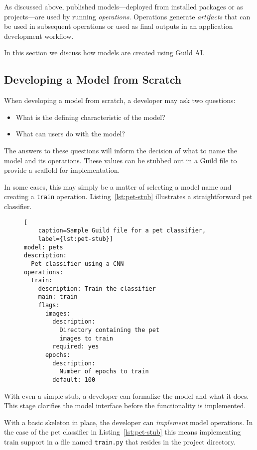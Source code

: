 \documentclass{article}
\begin{document}
As discussed above, published models---deployed from installed
packages or as projects---are used by running
\emph{operations}. Operations generate \emph{artifacts} that can be
used in subsequent operations or used as final outputs in an
application development workflow.

In this section we discuss how models are created using Guild AI.

\subsection{Developing a Model from Scratch}

When developing a model from scratch, a developer may ask two
questions:

\begin{itemize}
\item What is the defining characteristic of the model?
\item What can users do with the model?
\end{itemize}

The answers to these questions will inform the decision of what to
name the model and its operations. These values can be stubbed out in
a Guild file to provide a scaffold for implementation.

In some cases, this may simply be a matter of selecting a model name
and creating a \verb|train| operation. Listing~\ref{lst:pet-stub}
illustrates a straightforward pet classifier.

\begin{figure}
\begin{lstlisting}[
    caption=Sample Guild file for a pet classifier,
    label={lst:pet-stub}]
model: pets
description:
  Pet classifier using a CNN
operations:
  train:
    description: Train the classifier
    main: train
    flags:
      images:
        description:
          Directory containing the pet
          images to train
        required: yes
      epochs:
        description:
          Number of epochs to train
        default: 100
\end{lstlisting}
\end{figure}

With even a simple stub, a developer can formalize the model and what
it does. This stage clarifies the model interface before the
functionality is implemented.

With a basic skeleton in place, the developer can \emph{implement}
model operations. In the case of the pet classifier in
Listing~\ref{lst:pet-stub} this means implementing train support in a
file named \verb|train.py| that resides in the project directory.
\end{document}
